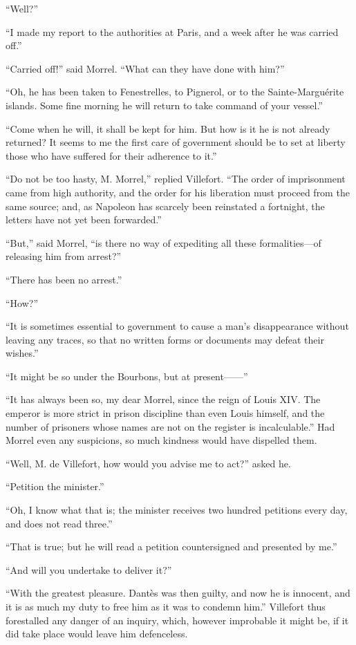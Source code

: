 “Well?”

“I made my report to the authorities at Paris, and a week after he was
carried off.”

“Carried off!” said Morrel. “What can they have done with him?”

“Oh, he has been taken to Fenestrelles, to Pignerol, or to the
Sainte-Marguérite islands. Some fine morning he will return to take
command of your vessel.”

“Come when he will, it shall be kept for him. But how is it he is not
already returned? It seems to me the first care of government should be
to set at liberty those who have suffered for their adherence to it.”

“Do not be too hasty, M. Morrel,” replied Villefort. “The order of
imprisonment came from high authority, and the order for his liberation
must proceed from the same source; and, as Napoleon has scarcely been
reinstated a fortnight, the letters have not yet been forwarded.”

“But,” said Morrel, “is there no way of expediting all these
formalities—of releasing him from arrest?”

“There has been no arrest.”

“How?”

“It is sometimes essential to government to cause a man’s disappearance
without leaving any traces, so that no written forms or documents may
defeat their wishes.”

“It might be so under the Bourbons, but at present——”

“It has always been so, my dear Morrel, since the reign of Louis XIV.
The emperor is more strict in prison discipline than even Louis
himself, and the number of prisoners whose names are not on the
register is incalculable.” Had Morrel even any suspicions, so much
kindness would have dispelled them.

“Well, M. de Villefort, how would you advise me to act?” asked he.

“Petition the minister.”

“Oh, I know what that is; the minister receives two hundred petitions
every day, and does not read three.”

“That is true; but he will read a petition countersigned and presented
by me.”

“And will you undertake to deliver it?”

“With the greatest pleasure. Dantès was then guilty, and now he is
innocent, and it is as much my duty to free him as it was to condemn
him.” Villefort thus forestalled any danger of an inquiry, which,
however improbable it might be, if it did take place would leave him
defenceless.

